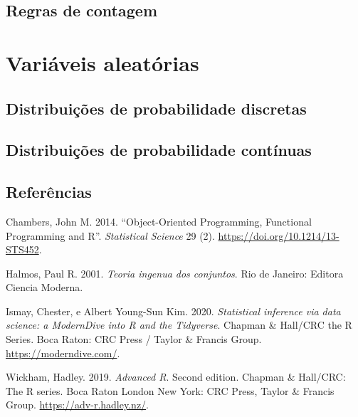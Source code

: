\documentclass[
  letterpaper,
]{book}
\newlength{\cslhangindent}
\newenvironment{CSLReferences}[2] %
 {\begin{list}{}{%
  \setlength{\itemindent}{0pt}
  \setlength{\leftmargin}{0pt}
  \setlength{\parsep}{0pt}
  \ifodd #1
   \setlength{\leftmargin}{\cslhangindent}
   \setlength{\itemindent}{-1\cslhangindent}
  \fi
  \setlength{\itemsep}{#2\baselineskip}}}
 {\end{list}}
\theoremstyle{definition}
\theoremstyle{plain}
\theoremstyle{remark}
\begin{document}
\chapter{Regras de contagem}\label{regras-de-contagem}

\part{Variáveis aleatórias}

\chapter{Distribuições de probabilidade
discretas}\label{distribuiuxe7uxf5es-de-probabilidade-discretas}

\chapter{Distribuições de probabilidade
contínuas}\label{distribuiuxe7uxf5es-de-probabilidade-contuxednuas}


\chapter*{Referências}\label{referuxeancias}


\label{refs}
\begin{CSLReferences}{1}{0}
Chambers, John M. 2014. {``Object-{Oriented} {Programming}, {Functional}
{Programming} and {R}''}. \emph{Statistical Science} 29 (2).
\url{https://doi.org/10.1214/13-STS452}.

Halmos, Paul R. 2001. \emph{Teoria ingenua dos conjuntos}. Rio de
Janeiro: Editora Ciencia Moderna.

Ismay, Chester, e Albert Young-Sun Kim. 2020. \emph{Statistical
inference via data science: a {ModernDive} into {R} and the
{Tidyverse}}. Chapman \& {Hall}/{CRC} the {R} {Series}. Boca Raton: CRC
Press / Taylor \& Francis Group. \url{https://moderndive.com/}.

Wickham, Hadley. 2019. \emph{Advanced {R}}. Second edition. Chapman \&
{Hall}/{CRC}: {The} {R} series. Boca Raton London New York: CRC Press,
Taylor \& Francis Group. \url{https://adv-r.hadley.nz/}.

\end{CSLReferences}
\end{document}
